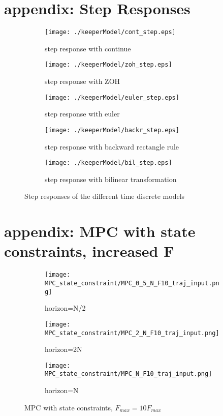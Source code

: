 \section{appendix: Step Responses}
	\begin{figure}[H]
		\centering
		\begin{subfigure}[b]{0.35\textwidth}
			\texttt{[image: ./keeperModel/cont\_step.eps]}
			\caption{step response with continue}
		\end{subfigure}
		\begin{subfigure}[b]{0.35\textwidth}
			\texttt{[image: ./keeperModel/zoh\_step.eps]}
			\caption{step response with ZOH}
		\end{subfigure}
		\begin{subfigure}[b]{0.35\textwidth}
			\texttt{[image: ./keeperModel/euler\_step.eps]}
			\caption{step response with euler}
		\end{subfigure}
		\begin{subfigure}[b]{0.35\textwidth}
			\texttt{[image: ./keeperModel/backr\_step.eps]}
			\caption{step response with backward rectangle rule}
		\end{subfigure}
		\begin{subfigure}[b]{0.35\textwidth}
			\texttt{[image: ./keeperModel/bil\_step.eps]}
			\caption{step response with bilinear transformation}
		\end{subfigure}
		\caption{Step responses of the different time discrete models}
		\label{fig:step responese disc}
	\end{figure}

\section{appendix: MPC with state constraints, increased F}
	\begin{figure}[H]
		\centering
		\begin{subfigure}[b]{0.45\textwidth}
			\texttt{[image: MPC\_state\_constraint/MPC\_0\_5\_N\_F10\_traj\_input.png]}
			\caption{horizon=N/2}
		\end{subfigure}
		\begin{subfigure}[b]{0.45\textwidth}
			\texttt{[image: MPC\_state\_constraint/MPC\_2\_N\_F10\_traj\_input.png]}
			\caption{horizon=2N}
		\end{subfigure}
		\begin{subfigure}[b]{0.45\textwidth}
			\texttt{[image: MPC\_state\_constraint/MPC\_N\_F10\_traj\_input.png]}
			\caption{horizon=N}
		\end{subfigure}
		\caption{MPC with state constraints, $F_{max}=10F_{max}$}
		\label{fig:MPC with state constraints increased F}
	\end{figure}

